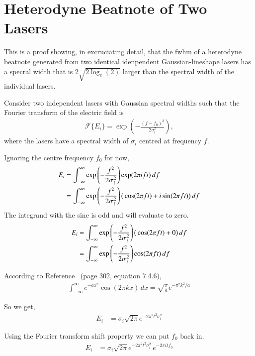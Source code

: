\chapter{Heterodyne Beatnote of Two Lasers}\label{appendix:heterodyne}

This is a proof showing, in excruciating detail, that the \gls{fwhm} of a heterodyne beatnote generated from two identical idenpendent Gaussian-lineshape lasers has  a specral width that is $2\sqrt{2\log_e(2)}$ larger than the spectral width of the individual lasers.

Consider two independent lasers with Gaussian spectral widths such that the Fourier transform of the electric field is
\begin{align}
\mathcal{F}\{E_i\} = \exp\left(-\frac{(f-f_0)^2}{2\sigma_i^2}\right),
\end{align}
where the lasers have a spectral width of $\sigma_i$ centred at frequency $f$.

Ignoring the centre frequency $f_0$ for now,
\begin{align}
E_i &= \int_{-\infty}^{\infty} \exp\left(-\frac{f^2}{2\sigma_i^2}\right) \exp(2\pi i f t) \,df\notag\\
&= \int_{-\infty}^{\infty} \exp\left(-\frac{f^2}{2\sigma_i^2}\right) \big(\cos(2\pi f t) + i\sin(2\pi f t)\big) \,df
\end{align}
The integrand with the sine is odd and will evaluate to zero.
\begin{align}
E_i &= \int_{-\infty}^{\infty} \exp\left(-\frac{f^2}{2\sigma_i^2}\right) \big(\cos(2\pi f t) + 0\big) \,df \notag\\
&= \int_{-\infty}^{\infty} \exp\left(-\frac{f^2}{2\sigma_i^2}\right)\cos(2\pi f t) \,df
\end{align}

According to Reference~\cite{abramowitz_handbook_2012} (page 302, equation 7.4.6),
\begin{align}
\int_{-\infty}^{\infty}e^{-ax^2}\cos(2\pi k x)\,dx = \sqrt{\frac{\pi}{a}} e^{-\pi^2k^2/a}
\end{align}

So we get,
\begin{align}
E_i &= \sigma_i\sqrt{2 \pi} e^{-2 \pi^2t^2 \sigma_i^2}
\end{align}

Using the Fourier transform shift property we can put $f_0$ back in.
\begin{align}
E_i &= \sigma_i\sqrt{2 \pi} e^{-2 \pi^2t^2 \sigma_i^2}\,e^{-2\pi i t f_0}
\end{align}

